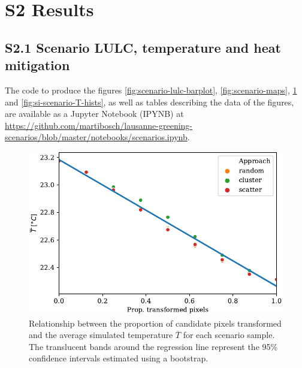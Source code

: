 \documentclass[10pt,letterpaper]{article}
\begin{document}
\section*{S2 Results}



\subsection*{S2.1 Scenario LULC, temperature and heat mitigation}
\label{sec:si-scenarios}

The code to produce the figures \ref{fig:scenario-lulc-barplot}, \ref{fig:scenario-maps}, \ref{fig:si-scenario-T-regplot} and \ref{fig:si-scenario-T-hists}, as well as tables describing the data of the figures, are available as a Jupyter Notebook (IPYNB) at \url{https://github.com/martibosch/lausanne-greening-scenarios/blob/master/notebooks/scenarios.ipynb}.

\begin{figure}[H]
  \centering
  \includegraphics[width=.6\textwidth]{figures/scenario-T-regplot}
  \caption{\label{fig:si-scenario-T-regplot} Relationship between the proportion of candidate pixels transformed and the average simulated temperature $\overline{T}$ for each scenario sample. The translucent bands around the regression line represent the 95\% confidence intervals estimated using a bootstrap.}
\end{figure}
\end{document}
